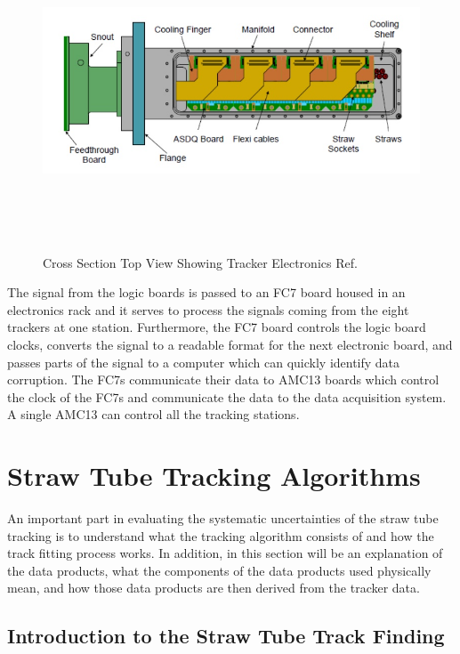 \documentclass[./Thesis]{subfiles}
\begin{document}
\begin{figure}
	\centerline{\includegraphics[height=95mm]{TopViewTracker.jpeg}}
	\caption[Top View of Tracker Electronics]{ Cross Section Top View Showing Tracker Electronics  Ref. \cite{jGrange}
	}
	\label{fig:TopViewTracker}
\end{figure} 

	
	The signal from the logic boards is passed to an FC7 board housed in an electronics rack and it serves to process the signals coming from the eight trackers at one station.  Furthermore, the FC7 board controls the logic board clocks, converts the signal to a readable format for the next electronic board, and passes parts of the signal to a computer which can quickly identify data corruption. The FC7s communicate their data to AMC13 boards which control the clock of the FC7s and communicate the data to the data acquisition system.  A single AMC13 can control all the tracking stations.
	
\section{Straw Tube Tracking Algorithms}

 	An important part in evaluating the systematic uncertainties of the straw tube tracking is to understand what the tracking algorithm consists of and how the track fitting process works.  In addition, in this section will be an explanation of the data products, what the components of the data products used physically mean, and how those data products are then derived from the tracker data.
			 
\subsection{Introduction to the Straw Tube Track Finding}
\end{document}
